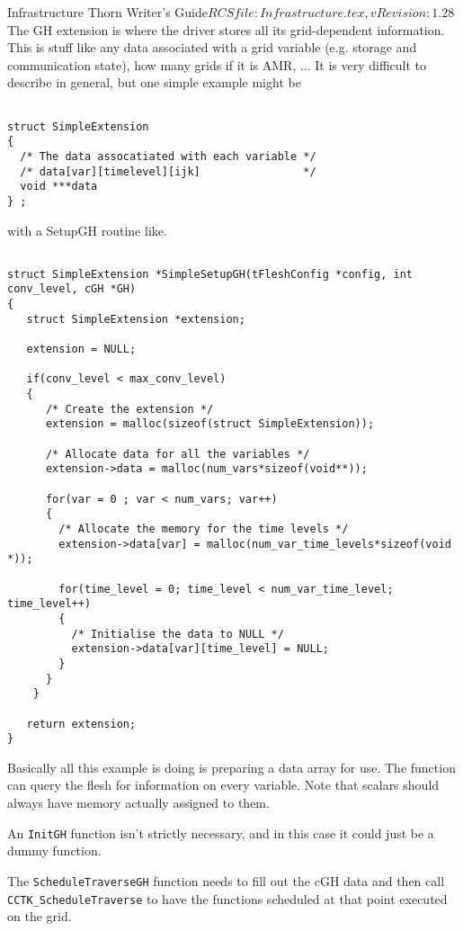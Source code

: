 \begin{cactuspart}{4}{Infrastructure Thorn Writer's Guide}{$RCSfile: Infrastructure.tex,v $}{$Revision: 1.28 $}
The GH extension is where the driver stores all its grid-dependent information.
This is stuff like any data associated with a grid variable (e.g. storage and
communication state), how many grids if it is AMR, ...  It is very difficult to 
describe in general, but one simple example might be

\begin{verbatim}

struct SimpleExtension
{
  /* The data assocatiated with each variable */
  /* data[var][timelevel][ijk]                */
  void ***data
} ;

\end{verbatim}

with a SetupGH routine like.

\begin{verbatim}

struct SimpleExtension *SimpleSetupGH(tFleshConfig *config, int conv_level, cGH *GH)
{
   struct SimpleExtension *extension;

   extension = NULL;

   if(conv_level < max_conv_level)
   {  
      /* Create the extension */
      extension = malloc(sizeof(struct SimpleExtension));

      /* Allocate data for all the variables */
      extension->data = malloc(num_vars*sizeof(void**));

      for(var = 0 ; var < num_vars; var++)
      {
        /* Allocate the memory for the time levels */
        extension->data[var] = malloc(num_var_time_levels*sizeof(void *));

        for(time_level = 0; time_level < num_var_time_level; time_level++)
        {
          /* Initialise the data to NULL */ 
          extension->data[var][time_level] = NULL;
        }
      }
    }

   return extension;
}

\end{verbatim}

Basically all this example is doing is preparing a data array for use.  The
function can query the flesh for information on every variable.  Note that 
scalars should always have memory actually assigned to them.

An {\tt InitGH} function isn't strictly necessary, and in this case it could just
be a dummy function.

The {\tt ScheduleTraverseGH} function needs to fill out the cGH data and then call 
{\tt CCTK\_ScheduleTraverse} to have the functions scheduled at that point executed on the
grid.


\end{cactuspart}

